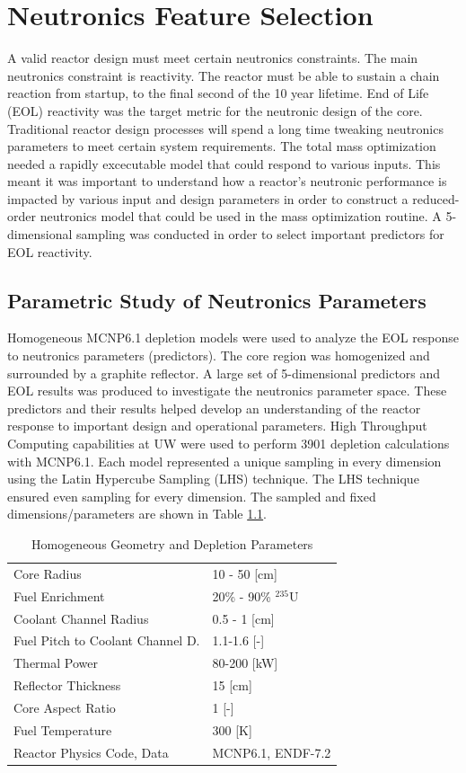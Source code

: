 \chapter{Neutronics Feature Selection} \label{ch:sweeps}
A valid reactor design must meet certain neutronics constraints. The main
neutronics constraint is reactivity. The reactor must be able to sustain a chain
reaction from startup, to the final second of the 10 year lifetime. End of Life
(EOL) reactivity was the target metric for the neutronic design of the core.
Traditional reactor design processes will spend a long time tweaking neutronics
parameters to meet certain system requirements. The total mass optimization
needed a rapidly excecutable model that could respond to various inputs.
This meant it was important to understand how a reactor's neutronic
performance is impacted by various input and design parameters in order to
construct a reduced-order neutronics model that could be used in the mass
optimization routine. A 5-dimensional 
sampling was conducted in order to select important predictors for EOL
reactivity.

\section{Parametric Study of Neutronics Parameters}
Homogeneous MCNP6.1 depletion models were used to analyze the EOL \keff response
to neutronics parameters (predictors). The core region was homogenized and
surrounded by a graphite reflector. A large set of 5-dimensional predictors and
EOL \keff results was produced to investigate the neutronics parameter space.
These predictors and their results helped develop an understanding of the
reactor response to important design and operational parameters. High Throughput
Computing capabilities at UW were used to perform 3901 depletion calculations
with MCNP6.1. Each model represented a unique sampling in every dimension using
the Latin Hypercube Sampling (LHS) technique\citep{LHS}. The LHS technique ensured even
sampling for every dimension. The sampled and fixed dimensions/parameters are
shown in Table \ref{tab:lhs_sweep_vars}.

\begin{table}[h]
  \centering
  \caption{Homogeneous Geometry and Depletion Parameters}
  \begin{tabular}{ll}
    \toprule
     Core Radius                		   & 10 - 50 [cm] \\
     Fuel Enrichment 					   & 20\% - 90\% $^{235}$U\\
     Coolant Channel Radius                & 0.5 - 1 [cm] \\
     Fuel Pitch to Coolant Channel D.      & 1.1-1.6 [-]\\
     Thermal Power						   & 80-200 [kW]\\
     Reflector Thickness				   & 15 [cm]\\
     Core Aspect Ratio					   & 1 [-] \\
     Fuel Temperature					   & 300 [K]\\
     Reactor Physics Code, Data			   & MCNP6.1, ENDF-7.2
  \end{tabular}
  \label{tab:lhs_sweep_vars}
\end{table}

